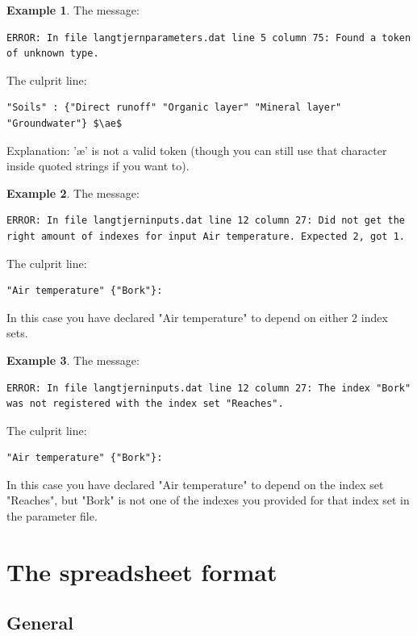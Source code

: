\documentclass[11pt]{article}
\theoremstyle{definition}
\newtheorem{myexample}{Example}
\newenvironment{example}%
  {\begin{lrbox}{\examplebox}%
   \begin{minipage}{\dimexpr\linewidth-2\fboxsep}
   \begin{myexample}}%
  {\end{myexample}%
   \end{minipage}%
   \end{lrbox}%
   \begin{trivlist}
     \item[]\colorbox{silver}{\usebox\examplebox}
   \end{trivlist}}
\begin{document}
\begin{example}
The message:
\begin{lstlisting}
ERROR: In file langtjernparameters.dat line 5 column 75: Found a token of unknown type.
\end{lstlisting}
The culprit line:
\begin{lstlisting}[mathescape]
"Soils" : {"Direct runoff" "Organic layer" "Mineral layer" "Groundwater"} $\ae$
\end{lstlisting}
Explanation: '\ae' is not a valid token (though you can still use that character inside quoted strings if you want to).
\end{example}

\begin{example}
The message:
\begin{lstlisting}
ERROR: In file langtjerninputs.dat line 12 column 27: Did not get the right amount of indexes for input Air temperature. Expected 2, got 1.
\end{lstlisting}
The culprit line:
\begin{lstlisting}[mathescape]
"Air temperature" {"Bork"}:
\end{lstlisting}
In this case you have declared "Air temperature" to depend on either 2 index sets.
\end{example}

\begin{example}
The message:
\begin{lstlisting}
ERROR: In file langtjerninputs.dat line 12 column 27: The index "Bork" was not registered with the index set "Reaches".
\end{lstlisting}
The culprit line:
\begin{lstlisting}[mathescape]
"Air temperature" {"Bork"}:
\end{lstlisting}
In this case you have declared "Air temperature" to depend on the index set "Reaches", but "Bork" is not one of the indexes you provided for that index set in the parameter file.
\end{example}

\section{The spreadsheet format}

\subsection{General}
\end{document}
